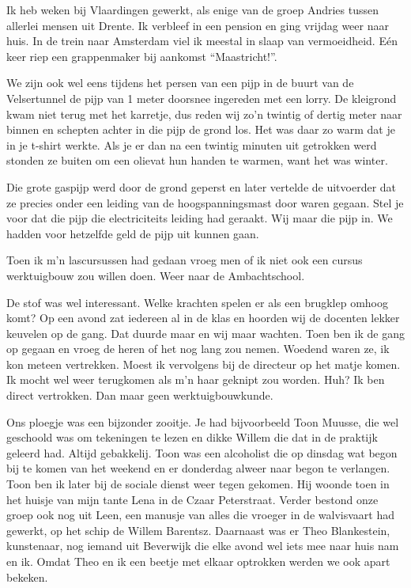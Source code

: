 \documentclass[12pt,twoside, openright]{memoir}
\begin{document}
Ik heb weken bij Vlaardingen gewerkt, als enige van de groep Andries tussen allerlei mensen uit Drente. Ik verbleef in een pension en ging vrijdag weer naar huis. In de trein naar Amsterdam viel ik meestal in slaap van vermoeidheid. Eén keer riep een grappenmaker bij aankomst ``Maastricht!''. 

We zijn ook wel eens tijdens het persen van een pijp in de buurt van de Velsertunnel de pijp van 1 meter doorsnee ingereden met een lorry. De kleigrond kwam niet terug met het karretje, dus reden wij zo'n twintig of dertig meter naar binnen en schepten achter in die pijp de grond los. Het was daar zo warm dat je in je t-shirt werkte. Als je er dan na een twintig minuten uit getrokken werd stonden ze buiten om een olievat hun handen te warmen, want het was winter. 

Die grote gaspijp werd door de grond geperst en later vertelde de uitvoerder dat ze precies onder een leiding van de hoogspanningsmast door waren gegaan. Stel je voor dat die pijp die electriciteits leiding had geraakt. Wij maar die pijp in. We hadden voor hetzelfde geld de pijp uit kunnen gaan.

Toen ik m’n lascursussen had gedaan vroeg men of ik niet ook een cursus werktuigbouw zou willen doen. Weer naar de Ambachtschool. 

De stof was wel interessant. Welke krachten spelen er als een brugklep omhoog komt? Op een avond zat iedereen al in de klas en hoorden wij de docenten lekker keuvelen op de gang. Dat duurde maar en wij maar wachten. Toen ben ik de gang op gegaan en vroeg de heren of het nog lang zou nemen. Woedend waren ze, ik kon meteen vertrekken. Moest ik vervolgens bij de directeur op het matje komen. Ik mocht wel weer terugkomen als m’n haar geknipt zou worden. Huh? Ik ben direct vertrokken. Dan maar geen werktuigbouwkunde.

Ons ploegje was een bijzonder zooitje. Je had bijvoorbeeld Toon Muusse, die wel geschoold was om tekeningen te lezen en dikke Willem die dat in de praktijk geleerd had. Altijd gebakkelij. Toon was een alcoholist die op dinsdag wat begon bij te komen van het weekend en er donderdag alweer naar begon te verlangen. Toon ben ik later bij de sociale dienst weer tegen gekomen. Hij woonde toen in het huisje van mijn tante Lena in de Czaar Peterstraat. Verder bestond onze groep ook nog uit Leen, een manusje van alles die vroeger in de walvisvaart had gewerkt, op het schip de Willem Barentsz. Daarnaast was er Theo Blankestein, kunstenaar, nog iemand uit Beverwijk die elke avond wel iets mee naar huis nam en ik. Omdat Theo en ik een beetje met elkaar optrokken werden we ook apart bekeken.
\end{document}
